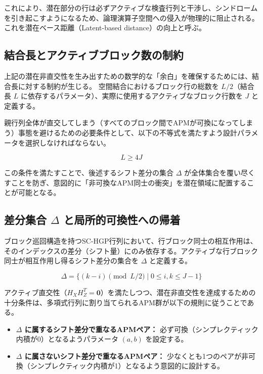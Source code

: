 \documentclass[12pt]{article}
\begin{document}
これにより、潜在部分の行は必ずアクティブな検査行列と干渉し、シンドロームを引き起こすようになるため、論理演算子空間への侵入が物理的に阻止される。これを潜在ベース距離（Latent-based distance）の向上と呼ぶ。

\subsection{結合長とアクティブブロック数の制約}
上記の潜在非直交性を生み出すための数学的な「余白」を確保するためには、結合長に対する制約が生じる。
空間結合におけるブロック行の総数を $L/2$（結合長 $L$ に依存するパラメータ）、実際に使用するアクティブなブロック行数を $J$ と定義する。

親行列全体が直交してしまう（すべてのブロック間でAPMが可換になってしまう）事態を避けるための必要条件として、以下の不等式を満たすよう設計パラメータを選択しなければならない。

\begin{equation}
    L \ge 4J
\end{equation}

この条件を満たすことで、後述するシフト差分の集合 $\Delta$ が全体集合を覆い尽くすことを防ぎ、意図的に「非可換なAPM同士の衝突」を潜在領域に配置することが可能となる。

\subsection{差分集合 $\Delta$ と局所的可換性への帰着}
ブロック巡回構造を持つSC-HGP行列において、行ブロック同士の相互作用は、そのインデックスの差分（シフト量）にのみ依存する。アクティブな行ブロック同士が相互作用し得るシフト差分の集合を $\Delta$ と定義する。

\begin{equation}
    \Delta = \{ (k - i) \pmod{L/2} \mid 0 \le i, k \le J-1 \}
\end{equation}

アクティブ直交性（$H_X H_Z^T = \mathbf{0}$）を満たしつつ、潜在非直交性を達成するための十分条件は、多項式行列に割り当てられるAPM群が以下の規則に従うことである。

\begin{itemize}
    \item \textbf{$\Delta$ に属するシフト差分で重なるAPMペア：} 必ず可換（シンプレクティック内積が0）となるようパラメータ $(a,b)$ を設定する。
    \item \textbf{$\Delta$ に属さないシフト差分で重なるAPMペア：} 少なくとも1つのペアが非可換（シンプレクティック内積が1）となるよう意図的に設計する。
\end{itemize}
\end{document}
